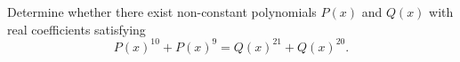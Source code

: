 Determine whether there exist non-constant polynomials $P(x)$ and $Q(x)$ with real coefficients satisfying
$$P(x)^{10}+P(x)^9 = Q(x)^{21}+Q(x)^{20}.$$

